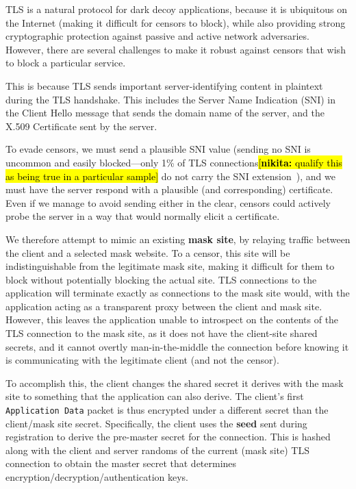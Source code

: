 \documentclass[letterpaper,twocolumn,10pt]{article}
\newcommand{\note}[2]{\hl{[\textbf{#1:} #2]}\xspace}
\newcommand{\nikita}[1]{\note{nikita}{#1}}
\begin{document}
TLS is a natural protocol for dark decoy applications, because it is ubiquitous on
the Internet (making it difficult for censors to block), while also providing
strong cryptographic protection against passive and active network adversaries.
However, there are several challenges to make it robust against censors that
wish to block a particular service.

This is because TLS sends important server-identifying content in plaintext
during the TLS handshake. This includes the Server Name Indication (SNI) in the
Client Hello message that sends the domain name of the server, and the
X.509 Certificate sent by the server.

To evade censors, we must send a plausible SNI value (sending no SNI is
uncommon and easily blocked---only 1\% of TLS connections\nikita{qualify this as being true in a particular sample} do not carry the
SNI extension~\cite{tls-fingerprint}), and we must have the server respond with
a plausible (and corresponding) certificate. Even if we manage to avoid sending
either in the clear, censors could actively probe the server in a
way that would normally elicit a certificate.


We therefore attempt to mimic an existing \textbf{mask site}, by relaying
traffic between the client and a selected mask website. To a censor, this site
will be indistinguishable from the legitimate mask site, making it difficult for
them to block without potentially blocking the actual site. TLS connections to the
application will terminate exactly as connections to the mask site would, with the
application acting as a transparent proxy between the client and mask site.
However, this leaves the application unable to introspect on the contents of the
TLS connection to the mask site, as it does not have the client-site shared
secrets, and it cannot overtly man-in-the-middle the connection before knowing
it is communicating with the legitimate client (and not the censor).


To accomplish this, the client changes the shared secret it derives with the
mask site to something that the application can also derive. The client's first
\texttt{Application Data} packet is thus encrypted under a different secret than
the client/mask site secret. Specifically, the client uses the \textbf{seed}
sent during registration to derive the pre-master secret for the connection.
This is hashed along with the client and server randoms of the current (mask
site) TLS connection to obtain the master secret that determines
encryption/decryption/authentication keys.
\end{document}
